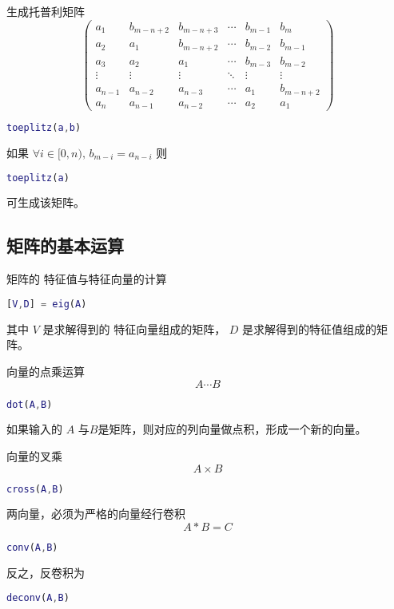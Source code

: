 \documentclass{ctexart}
\begin{document}
  生成托普利矩阵
  $$\left(\begin{array}{cccccc}
  a_1     & b_{m-n+2} & b_{m-n+3} & \cdots & b_{m-1} & b_m \\
  a_2     & a_1     & b_{m-n+2} & \cdots & b_{m-2} & b_{m-1}\\
  a_3     & a_2     & a_1     & \cdots & b_{m-3} & b_{m-2}\\
  \vdots  & \vdots  & \vdots  & \ddots & \vdots  & \vdots \\
  a_{n-1} & a_{n-2} & a_{n-3} & \cdots & a_1     & b_{m-n+2} \\
  a_n     & a_{n-1} & a_{n-2} & \cdots & a_2     & a_1
  \end{array}\right)$$
  \begin{lstlisting}[language=matlab]
  toeplitz(a,b)
  \end{lstlisting}
  如果 $\forall i \in [0,n) ,\, b_{m-i}=a_{n-i}$
  则
  \begin{lstlisting}[language=matlab]
  toeplitz(a)
  \end{lstlisting}
  可生成该矩阵。
      
  \subsection{矩阵的基本运算}
  \label{ssec:mat:bc}

  矩阵的 特征值与特征向量的计算
  \begin{lstlisting}[language=matlab]
  [V,D] = eig(A)
  \end{lstlisting}
  其中 $V$ 是求解得到的 特征向量组成的矩阵， $D$ 是求解得到的特征值组成的矩阵。
  
  向量的点乘运算
  $$A\cdots B$$
  \begin{lstlisting}[language=matlab]
  dot(A,B)
  \end{lstlisting}
  如果输入的 $A$ 与$B$是矩阵，则对应的列向量做点积，形成一个新的向量。
  
  向量的叉乘
  $$A \times B$$
  \begin{lstlisting}[language=matlab]
  cross(A,B)
  \end{lstlisting}
  
  两向量，必须为严格的向量经行卷积
  $$A*B=C$$
  \begin{lstlisting}[language=matlab]
  conv(A,B)
  \end{lstlisting}
  反之，反卷积为
  \begin{lstlisting}[language=matlab]
  deconv(A,B)
  \end{lstlisting}
  
\end{document}
